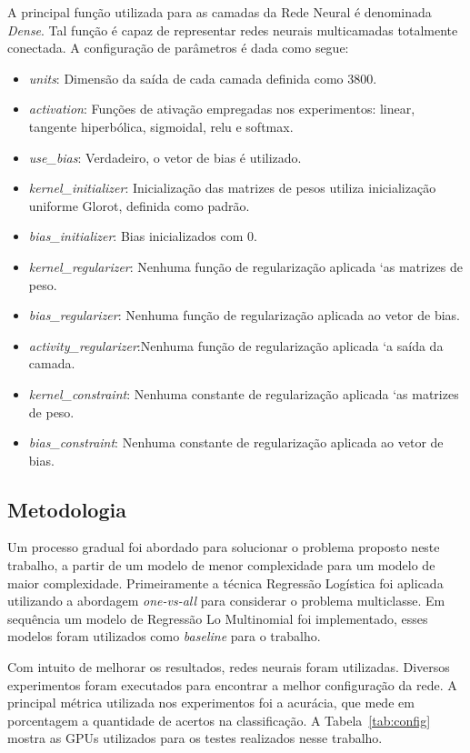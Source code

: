 \documentclass[conference]{IEEEtran}
\begin{document}
A principal função utilizada para as camadas da Rede Neural é denominada \textit{Dense}. Tal função é capaz de representar redes neurais multicamadas totalmente conectada. A configuração de parâmetros é dada como segue:
\begin{itemize}
	\item \textit{units}: Dimensão da saída de cada camada definida como $3800$.
	\item \textit{activation}: Funções de ativação empregadas nos experimentos: linear, tangente hiperbólica, sigmoidal, relu e softmax. 
	\item \textit{use\_bias}: Verdadeiro, o vetor de bias é utilizado.
	\item \textit{kernel\_initializer}: Inicialização das matrizes de pesos utiliza inicialização uniforme Glorot, definida como padrão.
	\item \textit{bias\_initializer}: Bias inicializados com $0$.
	\item \textit{kernel\_regularizer}: Nenhuma função de regularização aplicada `as matrizes de peso.
	\item \textit{bias\_regularizer}: Nenhuma função de regularização aplicada ao vetor de bias.
	\item \textit{activity\_regularizer}:Nenhuma função de regularização aplicada `a saída da camada.
	\item \textit{kernel\_constraint}: Nenhuma constante de regularização aplicada `as matrizes de peso.
	\item \textit{bias\_constraint}: Nenhuma constante de regularização aplicada ao vetor de bias.
\end{itemize}

\subsection{Metodologia} \label{sec:met}

Um processo gradual foi abordado para solucionar o problema proposto neste trabalho, a partir de um modelo de menor complexidade para um modelo de maior complexidade. Primeiramente a técnica Regressão Logística foi aplicada utilizando a abordagem \emph{one-vs-all} para considerar o problema multiclasse. Em sequência um modelo de Regressão Lo Multinomial foi implementado, esses modelos foram utilizados como \emph{baseline} para o trabalho.

Com intuito de melhorar os resultados, redes neurais foram utilizadas. Diversos experimentos foram executados para encontrar a melhor configuração da rede. A principal métrica utilizada nos experimentos foi a acurácia, que mede em porcentagem a quantidade de acertos na classificação. A Tabela~\ref{tab:config} mostra as GPUs utilizados para os testes realizados nesse trabalho.
\end{document}
